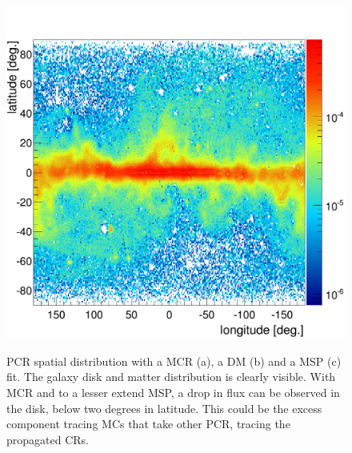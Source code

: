 \begin{figure}[h]
\begin{minipage}[h]{0.4\textwidth}
	  \label{}
  \end{minipage}
  \hfill
  \begin{minipage}[h]{0.4\textwidth}
	  \centering
	  \includegraphics[width=1.\linewidth]{pic/discussion/MSPonly_fine_PCR_integral_distribution.png}
	  \label{}
  \end{minipage}
  \caption[PCR spatial distributions.]{PCR spatial distribution with a MCR (a), a DM (b) and a MSP (c) fit. The galaxy disk and matter distribution is clearly visible. With MCR and to a lesser extend MSP, a drop in flux can be observed in the disk, below two degrees in latitude. This could be the excess component tracing MCs that take other PCR, tracing the propagated CRs.}
  \label{fig:PCR_flux_distrib_excess_comp}	 
\end{figure}


\newpage
